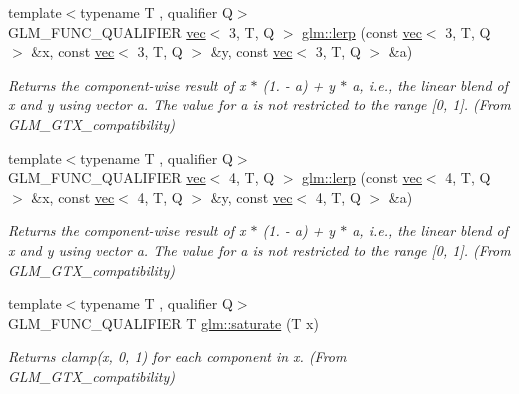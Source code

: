 \begin{DoxyCompactItemize}
{\footnotesize template$<$typename T , qualifier Q$>$ }\\G\+L\+M\+\_\+\+F\+U\+N\+C\+\_\+\+Q\+U\+A\+L\+I\+F\+I\+ER \hyperlink{structglm_1_1vec}{vec}$<$ 3, T, Q $>$ \hyperlink{group__gtx__compatibility_ga4ae1a616c8540a2649eab8e0cd051bb3}{glm\+::lerp} (const \hyperlink{structglm_1_1vec}{vec}$<$ 3, T, Q $>$ \&x, const \hyperlink{structglm_1_1vec}{vec}$<$ 3, T, Q $>$ \&y, const \hyperlink{structglm_1_1vec}{vec}$<$ 3, T, Q $>$ \&a)
\begin{DoxyCompactList}\small\item\em Returns the component-\/wise result of x $\ast$ (1. -\/ a) + y $\ast$ a, i.\+e., the linear blend of x and y using vector a. The value for a is not restricted to the range \mbox{[}0, 1\mbox{]}. (From G\+L\+M\+\_\+\+G\+T\+X\+\_\+compatibility) \end{DoxyCompactList}\item 
\mbox{\label{group__gtx__compatibility_gab5477ab69c40de4db5d58d3359529724}} 
{\footnotesize template$<$typename T , qualifier Q$>$ }\\G\+L\+M\+\_\+\+F\+U\+N\+C\+\_\+\+Q\+U\+A\+L\+I\+F\+I\+ER \hyperlink{structglm_1_1vec}{vec}$<$ 4, T, Q $>$ \hyperlink{group__gtx__compatibility_gab5477ab69c40de4db5d58d3359529724}{glm\+::lerp} (const \hyperlink{structglm_1_1vec}{vec}$<$ 4, T, Q $>$ \&x, const \hyperlink{structglm_1_1vec}{vec}$<$ 4, T, Q $>$ \&y, const \hyperlink{structglm_1_1vec}{vec}$<$ 4, T, Q $>$ \&a)
\begin{DoxyCompactList}\small\item\em Returns the component-\/wise result of x $\ast$ (1. -\/ a) + y $\ast$ a, i.\+e., the linear blend of x and y using vector a. The value for a is not restricted to the range \mbox{[}0, 1\mbox{]}. (From G\+L\+M\+\_\+\+G\+T\+X\+\_\+compatibility) \end{DoxyCompactList}\item 
\mbox{\label{group__gtx__compatibility_ga0fd09e616d122bc2ed9726682ffd44b7}} 
{\footnotesize template$<$typename T , qualifier Q$>$ }\\G\+L\+M\+\_\+\+F\+U\+N\+C\+\_\+\+Q\+U\+A\+L\+I\+F\+I\+ER T \hyperlink{group__gtx__compatibility_ga0fd09e616d122bc2ed9726682ffd44b7}{glm\+::saturate} (T x)
\begin{DoxyCompactList}\small\item\em Returns clamp(x, 0, 1) for each component in x. (From G\+L\+M\+\_\+\+G\+T\+X\+\_\+compatibility) \end{DoxyCompactList}\item 

\end{DoxyCompactItemize}
